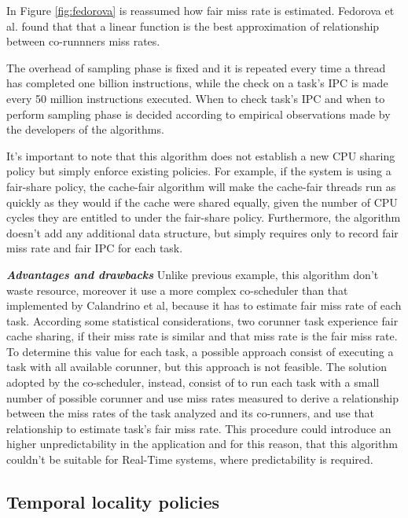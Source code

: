 \begin{description}
In Figure \ref{fig:fedorova} is reassumed how fair miss rate is estimated. Fedorova et al. found that that a linear function is the best approximation of 
relationship between co-runnners miss rates.

The overhead of sampling phase is fixed and it is repeated every time a thread has completed one billion instructions, while the check on a task's IPC
is made every 50 million instructions executed. When to check task's IPC and when to perform sampling phase is decided according to empirical observations
made by the developers of the algorithms.

It's important to note that this algorithm does not establish a new CPU sharing policy but simply enforce existing policies. For example, if the 
system is using a fair-share policy, the cache-fair algorithm will make the cache-fair threads run as quickly as they would if the cache were shared 
equally, given the number of CPU cycles they are entitled to under the fair-share policy. Furthermore, the algorithm doesn't add any additional data 
structure, but simply requires only to record fair miss rate and fair IPC for each task.

\textbf{\textit{Advantages and drawbacks}}
Unlike previous example, this algorithm don't waste resource, moreover it use a more complex co-scheduler than that implemented by Calandrino et al, 
because it has to estimate fair miss rate of each task. According some statistical considerations, two corunner task experience fair cache sharing, if 
their miss rate is similar and that miss rate is the fair miss rate. To determine this value for each task, a possible approach consist of executing a task 
with all available corunner, but this approach is not feasible. The solution adopted by the co-scheduler, instead, consist of to run each task with a small 
number of possible corunner and use miss rates measured to derive a relationship between the miss rates of the task analyzed and its co-runners, and use 
that relationship to estimate task's fair miss rate. This procedure could introduce an higher unpredictability in the application and for this reason, that 
this algorithm couldn't be suitable for Real-Time systems, where predictability is required.

\end{description}

\subsection{Temporal locality policies} 

